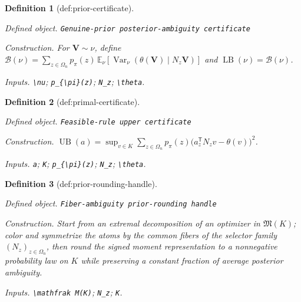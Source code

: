 \documentclass{article}
\newtheorem{definition}{Definition}
\begin{document}
\begin{definition}[def:prior-certificate]\label{def:prior-certificate}
\par\smallskip\noindent\emph{Defined object.} \texttt{Genuine-\allowbreak{}prior posterior-\allowbreak{}ambiguity certificate}
\par\smallskip\noindent\emph{Construction.} For \(\mathbf V\sim\nu\), define \(\mathcal B(\nu)=\sum_{z\in\Omega_n}p_{\pi}(z)\,\mathbb E_{\nu}[\operatorname{Var}_{\nu}(\theta(\mathbf V)\mid N_z\mathbf V)]\) and \(\operatorname{LB}(\nu)=\mathcal B(\nu)\).
\par\smallskip\noindent\emph{Inputs.} \texttt{\textbackslash{}\allowbreak{}nu}; \texttt{p\_\allowbreak{}\{\textbackslash{}\allowbreak{}pi\}\allowbreak{}(z)}; \texttt{N\_\allowbreak{}z}; \texttt{\textbackslash{}\allowbreak{}theta}.
\end{definition}

\begin{definition}[def:primal-certificate]\label{def:primal-certificate}
\par\smallskip\noindent\emph{Defined object.} \texttt{Feasible-\allowbreak{}rule upper certificate}
\par\smallskip\noindent\emph{Construction.} \(\operatorname{UB}(a)=\sup_{v\in K}\sum_{z\in\Omega_n}p_{\pi}(z)\bigl(a_z^{\mathsf T}N_zv-\theta(v)\bigr)^2\).
\par\smallskip\noindent\emph{Inputs.} \texttt{a}; \texttt{K}; \texttt{p\_\allowbreak{}\{\textbackslash{}\allowbreak{}pi\}\allowbreak{}(z)}; \texttt{N\_\allowbreak{}z}; \texttt{\textbackslash{}\allowbreak{}theta}.
\end{definition}

\begin{definition}[def:prior-rounding-handle]\label{def:prior-rounding-handle}
\par\smallskip\noindent\emph{Defined object.} \texttt{Fiber-\allowbreak{}ambiguity prior-\allowbreak{}rounding handle}
\par\smallskip\noindent\emph{Construction.} Start from an extremal decomposition of an optimizer in \(\mathfrak M(K)\); color and symmetrize the atoms by the common fibers of the selector family \((N_z)_{z\in\Omega_n}\), then round the signed moment representation to a nonnegative probability law on \(K\) while preserving a constant fraction of average posterior ambiguity.
\par\smallskip\noindent\emph{Inputs.} \texttt{\textbackslash{}\allowbreak{}mathfrak M(K)}; \texttt{N\_\allowbreak{}z}; \texttt{K}.
\end{definition}
\end{document}
